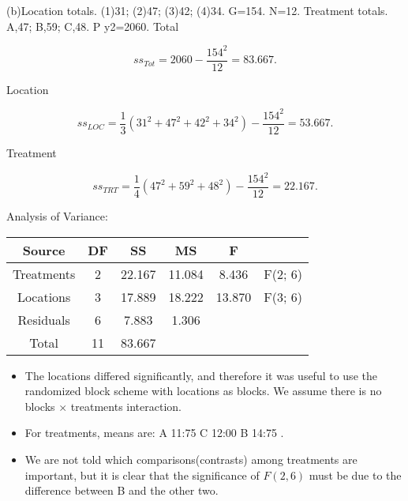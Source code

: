 \documentclass[a4paper,12pt]{article}
\begin{document}
\begin{enumerate}
\newpage

(b)Location totals. (1)31; (2)47; (3)42; (4)34. G=154. N=12.
Treatment totals. A,47; B,59; C,48.
P
y2=2060.
Total

\[ ss_{Tot}=2060 - \frac{154^2}{12} =83.667.\]

Location

\[ ss_{LOC} = \frac{1}{3} (31^2 + 47^2 + 42^2 + 34^2) - \frac{154^2}{12} = 53.667.  \]

Treatment

\[ ss_{TRT}= \frac{1}{4} (47^2 + 59^2 + 48^2) - \frac{154^2}{12} = 22.167.\]





Analysis of Variance:
\begin{center}
\begin{tabular}{|c|c|c|c|c|c|}\hline
Source	&	DF	&	SS	&	MS	&	F &	 \\ \hline \hline
Treatments	&	2	&	22.167	&	11.084	&	8.436	& F(2; 6)\\ \hline
Locations	&	3	&	17.889	&	18.222	&	13.870	& F(3; 6) \\ \hline
Residuals	&	6	&	7.883	&	1.306	&		& \\ \hline
Total	&	11	&	83.667	&		&		& \\ \hline
\end{tabular}
\end{center}

\begin{itemize}
    \item The locations differed significantly, and therefore it was useful to use the randomized block scheme
with locations as blocks. We assume there is no blocks $\times$ treatments interaction.
\item  For treatments, means are: A 11:75
C 12:00
B 14:75
. 
\item We are not told which comparisons(contrasts) among
treatments are important, but it is clear that the significance of $F(2,6)$ must be due to the difference
between B and the other two.
\end{itemize}


\end{enumerate}
\end{document}
